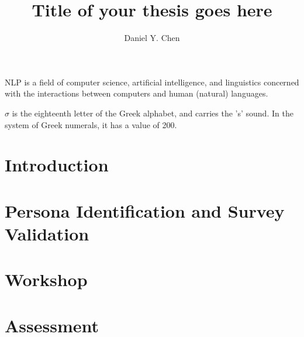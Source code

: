 \documentclass[doublespace,draft,nopageskip]{VTthesis} %
\title{Title of your thesis goes here}
\author{Daniel Y. Chen}
\begin{document}
  \frontmatter
  \maketitle
  \tableofcontents

	\listoffigures
	\listoftables
    \printnomenclature %

NLP is a field of computer science, artificial intelligence, and linguistics concerned with the interactions between computers and human (natural) languages.
 
 
$\sigma$ is the eighteenth letter of the Greek alphabet, and carries the 's' sound. In the system of Greek numerals, it has a value of 200. 
 

	\mainmatter

	\chapter{Introduction} \label{ch:introduction}
        

    \chapter{Persona Identification and Survey Validation} \label{ch:persona_validation}
        
        
    \chapter{Workshop} \label{ch:workshop}
        
        
    \chapter{Assessment} \label{ch:assessment}
        
\end{document}
